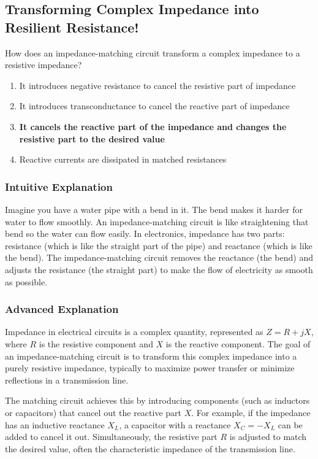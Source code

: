\subsection{Transforming Complex Impedance into Resilient Resistance!}

\begin{tcolorbox}[colback=gray!10!white,colframe=black!75!black,title=E7C04] How does an impedance-matching circuit transform a complex impedance to a resistive impedance?
    \begin{enumerate}[label=\Alph*,noitemsep]
        \item It introduces negative resistance to cancel the resistive part of impedance
        \item It introduces transconductance to cancel the reactive part of impedance
        \item \textbf{It cancels the reactive part of the impedance and changes the resistive part to the desired value}
        \item Reactive currents are dissipated in matched resistances
    \end{enumerate}
\end{tcolorbox}

\subsubsection{Intuitive Explanation}
Imagine you have a water pipe with a bend in it. The bend makes it harder for water to flow smoothly. An impedance-matching circuit is like straightening that bend so the water can flow easily. In electronics, impedance has two parts: resistance (which is like the straight part of the pipe) and reactance (which is like the bend). The impedance-matching circuit removes the reactance (the bend) and adjusts the resistance (the straight part) to make the flow of electricity as smooth as possible.

\subsubsection{Advanced Explanation}
Impedance in electrical circuits is a complex quantity, represented as \( Z = R + jX \), where \( R \) is the resistive component and \( X \) is the reactive component. The goal of an impedance-matching circuit is to transform this complex impedance into a purely resistive impedance, typically to maximize power transfer or minimize reflections in a transmission line.

The matching circuit achieves this by introducing components (such as inductors or capacitors) that cancel out the reactive part \( X \). For example, if the impedance has an inductive reactance \( X_L \), a capacitor with a reactance \( X_C = -X_L \) can be added to cancel it out. Simultaneously, the resistive part \( R \) is adjusted to match the desired value, often the characteristic impedance of the transmission line.

